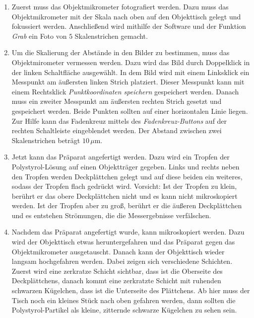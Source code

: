 \documentclass[a4paper, 12pt]{scrartcl}
\begin{document}
\begin{enumerate}

  \item Zuerst muss das Objektmikrometer fotografiert werden. Dazu muss das Objektmikrometer mit der Skala nach oben auf den Objekttisch gelegt und fokussiert werden. Anschließend wird mithilfe der Software und der Funktion \emph{Grab} ein Foto von $5$ Skalenstrichen gemacht.

  \item Um die Skalierung der Abstände in den Bilder zu bestimmen, muss das Objektmirometer vermessen werden. Dazu wird das Bild durch Doppelklick in der linken Schaltfläche ausgewählt. In dem Bild wird mit einem Linksklick ein Messpunkt am äußersten linken Strich platziert. Dieser Messpunkt kann mit einem Rechtsklick \emph{Punktkoordinaten speichern} gespeichert werden. Danach muss ein zweiter Messpunkt am äußersten rechten Strich gesetzt und gespeichert werden. Beide Punkten sollten auf einer horizontalen Linie liegen. Zur Hilfe kann das Fadenkreuz mittels des \emph{Fadenkreuz-Buttons} auf der rechten Schaltleiste eingeblendet werden. Der Abstand zwischen zwei Skalenstrichen beträgt $10 \, \mu$m.


  \item Jetzt kann das Präparat angefertigt werden. Dazu wird ein Tropfen der Polystyrol-Lösung auf einen Objektträger gegeben. Links und rechts neben den Tropfen werden Deckplättchen gelegt und auf diese beiden ein weiteres, sodass der Tropfen flach gedrückt wird. Vorsicht: Ist der Tropfen zu klein, berührt er das obere Deckplättchen nicht und es kann nicht mikroskopiert werden. Ist der Tropfen aber zu groß, berührt er die äußeren Deckplättchen und es entstehen Strömungen, die die Messergebnisse verfälschen.

  \item Nachdem das Präparat angefertigt wurde, kann mikroskopiert werden. Dazu wird der Objekttisch etwas heruntergefahren und das Präparat gegen das Objektmikrometer ausgetauscht. Danach kann der Objekttisch wieder langsam hochgefahren werden. Dabei zeigen sich verschiedene Schichten. Zuerst wird eine zerkratze Schicht sichtbar, dass ist die Oberseite des Deckplättchens, danach kommt eine zerkratzte Schicht mit ruhenden schwarzen Kügelchen, dass ist die Unterseite des Plättchens. Ab hier muss der Tisch noch ein kleines Stück nach oben gefahren werden, dann sollten die Polystyrol-Partikel als kleine, zitternde schwarze Kügelchen zu sehen sein.


\end{enumerate}
\end{document}
